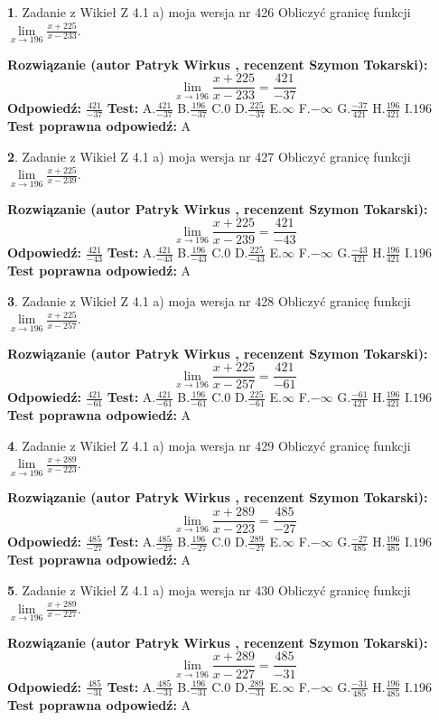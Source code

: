 \documentclass[12pt, a4paper]{article}
\theoremstyle{definition} %
\newtheorem{zad}{}
\newcommand{\zadStart}[1]{\begin{zad}#1\newline}
\newcommand{\zadStop}{\end{zad}}
\newcommand{\rozwStart}[2]{\noindent \textbf{Rozwiązanie (autor #1 , recenzent #2): }\newline}
\newcommand{\rozwStop}{\newline}
\newcommand{\odpStart}{\noindent \textbf{Odpowiedź:}\newline}
\newcommand{\odpStop}{\newline}
\newcommand{\testStart}{\noindent \textbf{Test:}\newline}
\newcommand{\testStop}{\newline}
\newcommand{\kluczStart}{\noindent \textbf{Test poprawna odpowiedź:}\newline}
\newcommand{\kluczStop}{\newline}
\begin{document}
\zadStart{Zadanie z Wikieł Z 4.1 a) moja wersja nr 426}
Obliczyć granicę funkcji $\lim\limits_{x\to196}\frac{x+225}{x-233}$.
\zadStop
\rozwStart{Patryk Wirkus}{Szymon Tokarski}
$$\lim\limits_{x\to196}\frac{x+225}{x-233} = \frac{421}{-37}$$
\rozwStop
\odpStart
$\frac{421}{-37}$
\odpStop
\testStart
A.$\frac{421}{-37}$
B.$\frac{196}{-37}$
C.$0$
D.$\frac{225}{-37}$
E.$\infty$
F.$-\infty$
G.$\frac{-37}{421}$
H.$\frac{196}{421}$
I.$196$
\testStop
\kluczStart
A
\kluczStop



\zadStart{Zadanie z Wikieł Z 4.1 a) moja wersja nr 427}
Obliczyć granicę funkcji $\lim\limits_{x\to196}\frac{x+225}{x-239}$.
\zadStop
\rozwStart{Patryk Wirkus}{Szymon Tokarski}
$$\lim\limits_{x\to196}\frac{x+225}{x-239} = \frac{421}{-43}$$
\rozwStop
\odpStart
$\frac{421}{-43}$
\odpStop
\testStart
A.$\frac{421}{-43}$
B.$\frac{196}{-43}$
C.$0$
D.$\frac{225}{-43}$
E.$\infty$
F.$-\infty$
G.$\frac{-43}{421}$
H.$\frac{196}{421}$
I.$196$
\testStop
\kluczStart
A
\kluczStop



\zadStart{Zadanie z Wikieł Z 4.1 a) moja wersja nr 428}
Obliczyć granicę funkcji $\lim\limits_{x\to196}\frac{x+225}{x-257}$.
\zadStop
\rozwStart{Patryk Wirkus}{Szymon Tokarski}
$$\lim\limits_{x\to196}\frac{x+225}{x-257} = \frac{421}{-61}$$
\rozwStop
\odpStart
$\frac{421}{-61}$
\odpStop
\testStart
A.$\frac{421}{-61}$
B.$\frac{196}{-61}$
C.$0$
D.$\frac{225}{-61}$
E.$\infty$
F.$-\infty$
G.$\frac{-61}{421}$
H.$\frac{196}{421}$
I.$196$
\testStop
\kluczStart
A
\kluczStop



\zadStart{Zadanie z Wikieł Z 4.1 a) moja wersja nr 429}
Obliczyć granicę funkcji $\lim\limits_{x\to196}\frac{x+289}{x-223}$.
\zadStop
\rozwStart{Patryk Wirkus}{Szymon Tokarski}
$$\lim\limits_{x\to196}\frac{x+289}{x-223} = \frac{485}{-27}$$
\rozwStop
\odpStart
$\frac{485}{-27}$
\odpStop
\testStart
A.$\frac{485}{-27}$
B.$\frac{196}{-27}$
C.$0$
D.$\frac{289}{-27}$
E.$\infty$
F.$-\infty$
G.$\frac{-27}{485}$
H.$\frac{196}{485}$
I.$196$
\testStop
\kluczStart
A
\kluczStop



\zadStart{Zadanie z Wikieł Z 4.1 a) moja wersja nr 430}
Obliczyć granicę funkcji $\lim\limits_{x\to196}\frac{x+289}{x-227}$.
\zadStop
\rozwStart{Patryk Wirkus}{Szymon Tokarski}
$$\lim\limits_{x\to196}\frac{x+289}{x-227} = \frac{485}{-31}$$
\rozwStop
\odpStart
$\frac{485}{-31}$
\odpStop
\testStart
A.$\frac{485}{-31}$
B.$\frac{196}{-31}$
C.$0$
D.$\frac{289}{-31}$
E.$\infty$
F.$-\infty$
G.$\frac{-31}{485}$
H.$\frac{196}{485}$
I.$196$
\testStop
\kluczStart
A
\kluczStop
\end{document}
